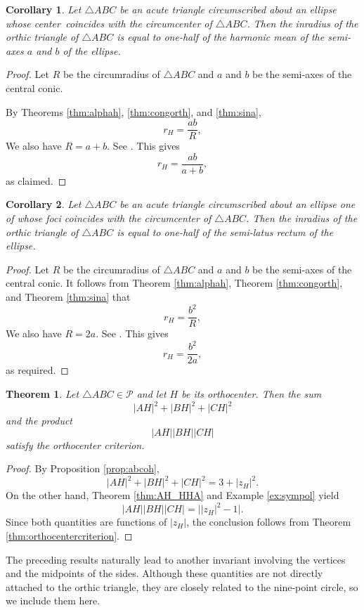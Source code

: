 \documentclass[11pt,reqno]{amsart}
\newtheorem{theorem}{Theorem}[section]
\newtheorem{corollary}{Corollary}[section]
\theoremstyle{definition}
\numberwithin{equation}{section}
\begin{document}
\begin{corollary}
Let $\triangle ABC$ be an acute triangle circumscribed about an ellipse whose center \,coincides with the circumcenter of $\triangle ABC$. Then the inradius of the orthic triangle of $\triangle ABC$ is equal to one-half of the harmonic mean of the semi-axes $a$ and $b$ of the ellipse.
\end{corollary}
\begin{proof}
Let $R$ be the circumradius of $\triangle ABC$ and $a$ and $b$ be the semi-axes of the central conic.

By Theorems \ref{thm:alphah}, \ref{thm:congorth}, and \ref{thm:sina}, 
\[
r_H = \frac{ab}{R},
\]
We also have $R=a+b$. See \cite[Corollary 2.2]{Murad2026b}. This gives
\[
r_H = \frac{ab}{a+b},
\]
as claimed.
\end{proof}

\begin{corollary}
Let $\triangle ABC$ be an acute triangle circumscribed about an ellipse one of whose foci coincides with the circumcenter of $\triangle ABC$. Then the inradius of the orthic triangle of $\triangle ABC$ is equal to one-half of the semi-latus rectum of the ellipse.
\end{corollary}
\begin{proof} 
Let $R$ be the circumradius of $\triangle ABC$ and $a$ and $b$ be the semi-axes of the central conic. It follows from Theorem \ref{thm:alphah}, Theorem \ref{thm:congorth}, and Theorem \ref{thm:sina} that 
\[
r_H = \frac{b^2}{R},
\]
We also have $R=2a$. See \cite[Corollary 2.3]{Murad2026b}. This gives
\[
r_H = \frac{b^2}{2a},
\]
as required.
\end{proof}

\begin{theorem}
Let $\triangle ABC \in \mathcal P$ and let $H$ be its orthocenter. Then the sum 
\[
|AH|^2+|BH|^2+|CH|^2
\]
and the product
\[
|AH||BH||CH|
\]
satisfy the orthocenter criterion.
\end{theorem}
\begin{proof}
By Proposition \ref{prop:abcoh},
\[
|AH|^2+|BH|^2+|CH|^2
=
3+|z_H|^2.
\]
On the other hand, Theorem \ref{thm:AH_HHA} and Example \ref{ex:sympol} yield
\[
|AH||BH||CH|=\bigl||z_H|^2-1\bigr|.
\]
Since both quantities are functions of $|z_H|$, the conclusion follows from Theorem \ref{thm:orthocentercriterion}.
\end{proof}

The preceding results naturally lead to another invariant involving the vertices and the midpoints of the sides. Although these quantities are not directly attached to the orthic triangle, they are closely related to the nine-point circle, so we include them here. 
\end{document}
